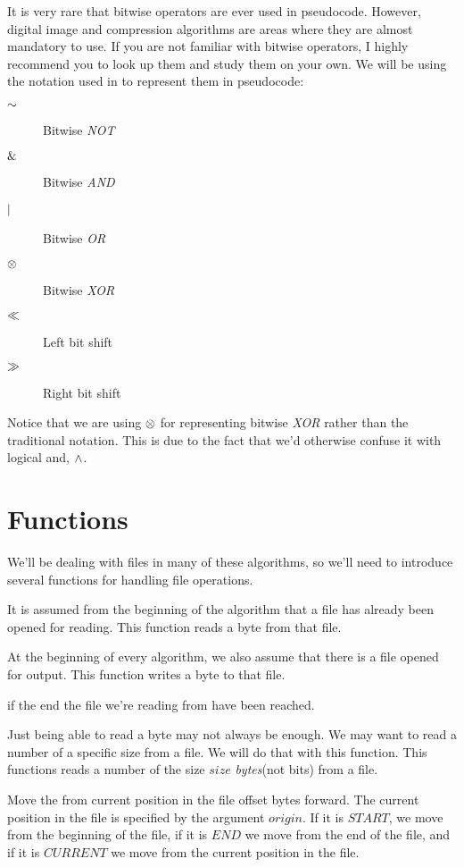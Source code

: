 It is very rare that bitwise operators are ever used in
pseudocode. However, digital image and compression algorithms are
areas where they are almost mandatory to use. If you are not familiar
with bitwise operators, I highly recommend you to look up them and
study them on your own. We will be using the notation used in \C to
represent them in pseudocode:

\begin{description}
\item[$\mathord{\sim}$] Bitwise \textit{NOT}
\item[$\mathrel{\&}$] Bitwise \textit{AND}
\item[$\mathrel{|}$] Bitwise \textit{OR}
\item[$\mathrel{\otimes}$] Bitwise \textit{XOR}
\item[$\ll$] Left bit shift
\item[$\gg$] Right bit shift
\end{description}

Notice that we are using $\mathrel{\otimes}$ for representing bitwise
\textit{XOR} rather than the traditional \C notation. This is due to
the fact that we'd otherwise confuse it with logical and, $\wedge$.

\section{Functions}
\label{sec:pseudocode}

We'll be dealing with files in many of these algorithms, so we'll need
to introduce several functions for handling file operations.

\begin{description}[font=\normalfont]
\item[\textproc{ReadByte}] It is assumed from the beginning of the
  algorithm that a file has already been opened for reading. This
  function reads a byte from that file.

\item[\Call{WriteByte}{$byte$}] At the beginning of every algorithm,
  we also assume that there is a file opened for output. This function
  writes a byte to that file.

\item[\textproc{EndOfFileReached}] \True{} if the end the file we're
  reading from have been reached.

\item[\Call{Read}{$size$}] Just being able to read a byte may not
  always be enough. We may want to read a number of a specific size
  from a file. We will do that with this function. This functions
  reads a number of the size $size$ \textit{bytes}(not bits) from a
  file.

\item[\Call{Seek}{$offset,origin$}] Move the from current position in
  the file offset bytes forward. The current position in the file is
  specified by the argument $origin$. If it is $START$, we move from the
  beginning of the file, if it is $END$ we move from the end of the
  file, and if it is $CURRENT$ we move from the current position in
  the file.

\end{description}


